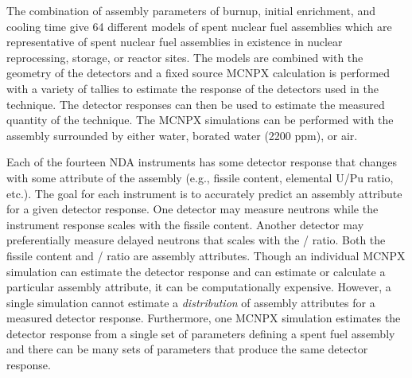 \documentclass{ansnse}
\begin{document}
The combination of assembly parameters of burnup, initial enrichment, and cooling time give 64 different models of spent nuclear fuel assemblies which are representative of spent nuclear fuel assemblies in existence in nuclear reprocessing, storage, or reactor sites.  The models are combined with the geometry of the detectors and a fixed source MCNPX calculation is performed with a variety of tallies to estimate the response of the detectors used in the technique.  The detector responses can then be used to estimate the measured quantity of the technique.  The MCNPX simulations can be performed with the assembly surrounded by either water, borated water (2200 ppm), or air.

Each of the fourteen NDA instruments has some detector response that changes with some attribute of the assembly (e.g., fissile content, elemental U/Pu ratio, etc.).  The goal for each instrument is to accurately predict an assembly attribute for a given detector response.  One detector may measure neutrons while the instrument response scales with the fissile content.  Another detector may preferentially measure delayed neutrons that scales with the / ratio.  Both the fissile content and / ratio are assembly attributes.  Though an individual MCNPX simulation can estimate the detector response and can estimate or calculate a particular assembly attribute, it can be computationally expensive.  However, a single simulation cannot estimate a \emph{distribution} of assembly attributes for a measured detector response.  Furthermore, one MCNPX simulation estimates the detector response from a single set of parameters defining a spent fuel assembly and there can be many sets of parameters that produce the same detector response.
\end{document}
